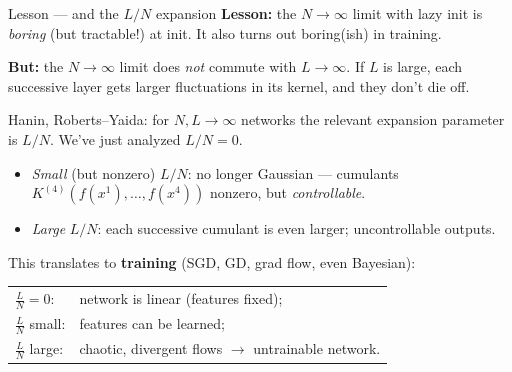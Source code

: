 \documentclass[11pt]{beamer}
\newcommand{\hl}[1]{{\color{blue!60!black}\textbf{#1}}}
\begin{document}
\begin{frame}{Lesson --- and the $L/N$ expansion}
  \hl{Lesson:} the $N\to\infty$ limit with lazy init is \emph{boring} (but tractable!) at
  init. It also turns out boring(ish) in training.
  \vspace{1mm}

  \hl{But:} the $N\to\infty$ limit does \emph{not} commute with
  $L\to\infty$. If $L$ is large, each successive layer gets larger
  fluctuations in its kernel, and they don't die off.
  \vspace{1mm}

  Hanin, Roberts--Yaida: for $N, L \to\infty$ networks the relevant
  expansion parameter is $\boxed{L/N}$. We've just analyzed $L/N = 0$.
  \begin{itemize}
    \item \emph{Small} (but nonzero) $L/N$: no longer Gaussian ---
      cumulants $K^{(4)}(f(x^1), \dots, f(x^4))$ nonzero, but
      \emph{controllable}.
    \item \emph{Large} $L/N$: each successive cumulant is even larger;
      uncontrollable outputs.
  \end{itemize}
  \vspace{1mm}

  This translates to \hl{training} (SGD, GD, grad flow, even Bayesian):
  \begin{center}
  \begin{tabular}{ll}
    $\tfrac LN = 0$: & network is linear (features fixed); \\
    $\tfrac LN$ small: & features can be learned; \\
    $\tfrac LN$ large: & chaotic, divergent flows $\to$ untrainable network.
  \end{tabular}
  \end{center}
\end{frame}
\end{document}
